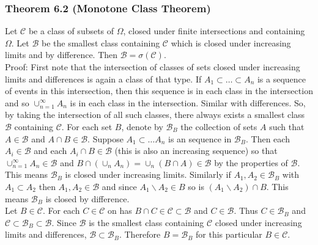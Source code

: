 \documentclass{article}
\begin{document}
{\subsubsection*{Theorem 6.2 (Monotone Class Theorem)}

Let $\mathcal{C}$ be a class of subsets of $\Omega$, closed under finite intersections and containing $\Omega$. Let $\mathcal{B}$ be the smallest class containing $\mathcal{C}$  which is closed under increasing limits and by difference. Then $\mathcal{B} = \sigma(\mathcal{C})$. \\

Proof: First note that the intersection of classes of sets closed under increasing limits and differences is again a class of that type. If $A_1 \subset \dots \subset A_n$ is a sequence of events in this intersection, then this sequence is in each class in the intersection and so $\cup_{n=1}^\infty A_n$ is in each class in the intersection. Similar with differences. So, by taking the intersection of all such classes, there always exists a smallest class $\mathcal{B}$ containing $\mathcal{C}$. For each set $B$, denote by $\mathcal{B}_B$ the collection of sets $A$ such that $A \in \mathcal{B}$ and $A\cap B \in \mathcal{B}$. Suppose $A_1 \subset \dots A_n$ is an sequence in $\mathcal{B}_B$. Then each $A_i \in \mathcal{B}$ and each $A_i \cap B \in \mathcal{B}$ (this is also an increasing sequence) so that $\cup_{n=1}^\infty A_n \in \mathcal{B}$ and $B \cap (\cup_n A_n) = \cup_n (B \cap A) \in \mathcal{B}$ by the properties of $\mathcal{B}$. This means $\mathcal{B}_B$ is closed under increasing limits. Similarly if $A_1, A_2 \in \mathcal{B}_B$ with $A_1 \subset A_2$ then $A_1, A_2 \in \mathcal{B}$ and since $A_1 \backslash A_2 \in B$ so is $(A_1 \backslash A_2) \cap B$. This means $\mathcal{B}_B$ is closed by difference. \\

Let $B \in \mathcal{C}$. For each $C \in \mathcal{C}$ on has $B\cap C \in \mathcal{C}\subset \mathcal{B}$ and $C \in \mathcal{B}$. Thus $C \in \mathcal{B}_B$ and $\mathcal{C} \subset \mathcal{B}_B \subset \mathcal{B}$. Since $\mathcal{B}$ is the smallest class containing $\mathcal{C}$ closed under increasing limits and differences, $\mathcal{B} \subset \mathcal{B}_B$. Therefore $B = \mathcal{B}_B$ for this particular $B \in \mathcal{C}$. \\

}
\end{document}
